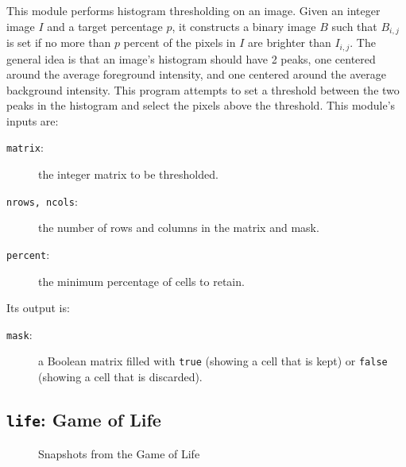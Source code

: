 This module performs histogram thresholding on an image.
Given an integer image $I$ and a target percentage $p$,
it constructs a binary image $B$
such that $B_{i,j}$ is set
if no more than $p$ percent of the pixels in $I$ are brighter than $I_{i,j}$.
The general idea is that an image's histogram should have 2 peaks,
one centered around the average foreground intensity,
and one centered around the average background intensity.
This program attempts to set
a threshold between the two peaks in the histogram
and select the pixels above the threshold.
This module's inputs are:
\begin{description}
\item[{\tt{matrix}}:]
	the integer matrix to be thresholded.
\item[{\tt{nrows, ncols}}:]
	the number of rows and columns in the matrix and mask.
\item[{\tt{percent}}:]
	the minimum percentage of cells to retain.
\end{description}
Its output is:
\begin{description}
\item[{\tt{mask}}:]
	a Boolean matrix filled with {\tt{true}} (showing a cell that is kept) or {\tt{false}} (showing a cell that is discarded).
\end{description}

\subsection{{\tt{life}}:
	Game of Life
	\label{s:toys-life}}

\begin{figure}
\begin{center}
{\textwidth{}}
{\textwidth{}}
{\textwidth{}}
{\textwidth{}}
\end{center}
\caption{Snapshots from the Game of Life\label{f:life}}
\end{figure}

